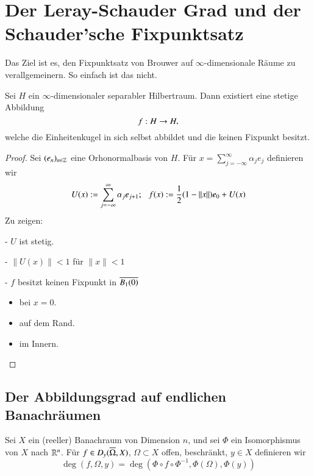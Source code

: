 \newpage

\chapter{Der Leray-Schauder Grad und der Schauder'sche Fixpunktsatz}

Das Ziel ist es, den Fixpunktsatz von Brouwer auf $\infty$-dimensionale Räume zu verallgemeinern.
So einfach ist das nicht.

\begin{theorem}[Kakutani]\label{3.1}
    Sei $H$ ein $\infty$-dimensionaler separabler Hilbertraum. Dann existiert eine stetige Abbildung
    \[
        f:H\rightarrow H,
    \]
    welche die Einheitenkugel in sich selbst abbildet und die keinen Fixpunkt besitzt.
\end{theorem}

\begin{proof}
    Sei $(e_n)_{n\in \mathbb{Z}}$ eine Orhonormalbasis von $H$. Für $x=\sum_{j=-\infty}^\infty\alpha_je_j$
    definieren wir
    \[
        U(x):=\sum_{j=-\infty}^\infty \alpha _je_{j+1};\hspace{.25cm} f(x):=\frac12 (1-\|x\|)e_0+U(x)
    \]
    Zu zeigen:
    \begin{description}
    \item{-}
    $U$ ist stetig.
    \item{-}
    $\|U(x)\|<1$ für $\|x\|<1$
    \item{-}
    $f$ besitzt keinen Fixpunkt in $\overline{B_1(0)}$
    \begin{itemize}
        \item bei $x=0$.
        \item auf dem Rand.
        \item im Innern.
    \end{itemize}
    \end{description}
    \[  \]
\end{proof}

\section{Der Abbildungsgrad auf endlichen Banachräumen}

\begin{defi}\label{3.2}
    Sei $X$ ein (reeller) Banachraum von Dimension $n$, und sei $\Phi$ ein Isomorphismus von $X$ nach 
    $\mathbb{R}^n$. Für $f\in D_y(\overline \Omega,X)$, $\Omega \subset X$ offen, beschränkt, $y\in X$ definieren wir
    \[
        \deg(f,\Omega,y)=\deg(\Phi\circ f \circ \Phi^{-1},\Phi(\Omega),\Phi(y))
    \]
\end{defi}

